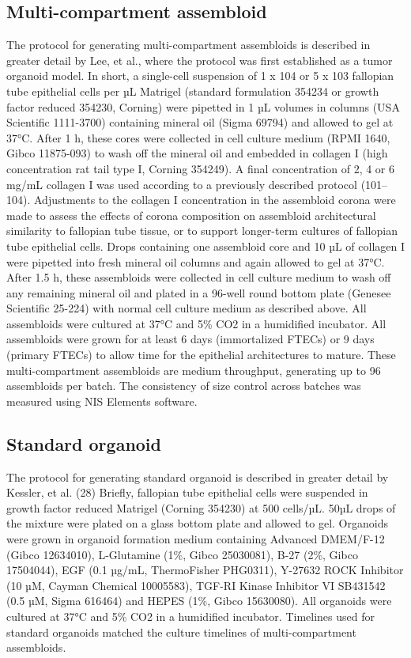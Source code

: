 \begin{refsection}
    \subsection{Multi-compartment assembloid}
    The protocol for generating multi-compartment assembloids is described in greater detail by Lee, et al., where the protocol was first established as a tumor organoid model\cite{lee2022a}. In short, a single-cell suspension of 1 x 104 or 5 x 103 fallopian tube epithelial cells per µL Matrigel (standard formulation 354234 or growth factor reduced 354230, Corning) were pipetted in 1 µL volumes in columns (USA Scientific 1111-3700) containing mineral oil (Sigma 69794) and allowed to gel at 37°C. After 1 h, these cores were collected in cell culture medium (RPMI 1640, Gibco 11875-093) to wash off the mineral oil and embedded in collagen I (high concentration rat tail type I, Corning 354249). A final concentration of 2, 4 or 6 mg/mL collagen I was used according to a previously described protocol (101–104). Adjustments to the collagen I concentration in the assembloid corona were made to assess the effects of corona composition on assembloid architectural similarity to fallopian tube tissue, or to support longer-term cultures of fallopian tube epithelial cells.  Drops containing one assembloid core and 10 µL of collagen I were pipetted into fresh mineral oil columns and again allowed to gel at 37°C. After 1.5 h, these assembloids were collected in cell culture medium to wash off any remaining mineral oil and plated in a 96-well round bottom plate (Genesee Scientific 25-224) with normal cell culture medium as described above. All assembloids were cultured at 37°C and 5\% CO2 in a humidified incubator. All assembloids were grown for at least 6 days (immortalized FTECs) or 9 days (primary FTECs) to allow time for the epithelial architectures to mature. These multi-compartment assembloids are medium throughput, generating up to 96 assembloids per batch.  The consistency of size control across batches was measured using NIS Elements software.
    
    \subsection{Standard organoid}
    The protocol for generating standard organoid is described in greater detail by Kessler, et al. (28) Briefly, fallopian tube epithelial cells were suspended in growth factor reduced Matrigel (Corning 354230) at 500 cells/µL. 50µL drops of the mixture were plated on a glass bottom plate and allowed to gel. Organoids were grown in organoid formation medium containing Advanced DMEM/F-12 (Gibco 12634010), L-Glutamine (1\%, Gibco 25030081), B-27 (2\%, Gibco 17504044), EGF (0.1 µg/mL, ThermoFisher PHG0311), Y-27632 ROCK Inhibitor (10 µM, Cayman Chemical 10005583), TGF-\textbeta RI Kinase Inhibitor VI SB431542 (0.5 µM, Sigma 616464) and HEPES (1\%, Gibco 15630080). All organoids were cultured at 37°C and 5\% CO2 in a humidified incubator. Timelines used for standard organoids matched the culture timelines of multi-compartment assembloids.

\end{refsection}
